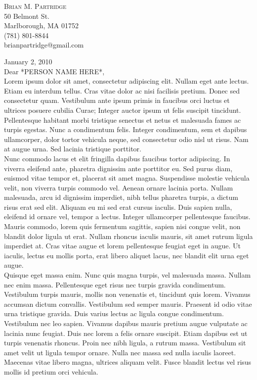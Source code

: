 \documentclass[11pt]{article}
\newcommand{\contact}[2]{\vspace*{-8pt}\begin{flushright}{\LARGE \scshape {#1}}\\#2\end{flushright}\vspace*{-8pt}}
\begin{document}
\small
\smallskip
\vspace*{-44pt}


\contact{Brian M. Partridge}
{
50 Belmont St. \\
Marlborough, MA 01752\\
(781) 801-8844\\
brianpartridge@gmail.com 
}

\noindent January 2, 2010\\


\noindent Dear *PERSON NAME HERE*,\\


Lorem ipsum dolor sit amet, consectetur adipiscing elit. Nullam eget ante lectus. Etiam eu interdum tellus. Cras vitae dolor ac nisi facilisis pretium. Donec sed consectetur quam. Vestibulum ante ipsum primis in faucibus orci luctus et ultrices posuere cubilia Curae; Integer auctor ipsum ut felis suscipit tincidunt. Pellentesque habitant morbi tristique senectus et netus et malesuada fames ac turpis egestas. Nunc a condimentum felis. Integer condimentum, sem et dapibus ullamcorper, dolor tortor vehicula neque, sed consectetur odio nisl ut risus. Nam at augue urna. Sed lacinia tristique porttitor.\\

Nunc commodo lacus et elit fringilla dapibus faucibus tortor adipiscing. In viverra eleifend ante, pharetra dignissim ante porttitor eu. Sed purus diam, euismod vitae tempor et, placerat sit amet magna. Suspendisse molestie vehicula velit, non viverra turpis commodo vel. Aenean ornare lacinia porta. Nullam malesuada, arcu id dignissim imperdiet, nibh tellus pharetra turpis, a dictum risus erat sed elit. Aliquam eu mi sed erat cursus iaculis. Duis sapien nulla, eleifend id ornare vel, tempor a lectus. Integer ullamcorper pellentesque faucibus. Mauris commodo, lorem quis fermentum sagittis, sapien nisi congue velit, non blandit dolor ligula ut erat. Nullam rhoncus iaculis mauris, sit amet rutrum ligula imperdiet at. Cras vitae augue et lorem pellentesque feugiat eget in augue. Ut iaculis, lectus eu mollis porta, erat libero aliquet lacus, nec blandit elit urna eget augue.\\

Quisque eget massa enim. Nunc quis magna turpis, vel malesuada massa. Nullam nec enim massa. Pellentesque eget risus nec turpis gravida condimentum. Vestibulum turpis mauris, mollis non venenatis et, tincidunt quis lorem. Vivamus accumsan dictum convallis. Vestibulum sed semper mauris. Praesent id odio vitae urna tristique gravida. Duis varius lectus ac ligula congue condimentum. Vestibulum nec leo sapien. Vivamus dapibus mauris pretium augue vulputate ac lacinia nunc feugiat. Duis nec lorem a felis ornare suscipit. Etiam dapibus est ut turpis venenatis rhoncus. Proin nec nibh ligula, a rutrum massa. Vestibulum sit amet velit ut ligula tempor ornare. Nulla nec massa sed nulla iaculis laoreet. Maecenas vitae libero magna, ultrices aliquam velit. Fusce blandit lectus vel risus mollis id pretium orci vehicula.\\
\end{document}
